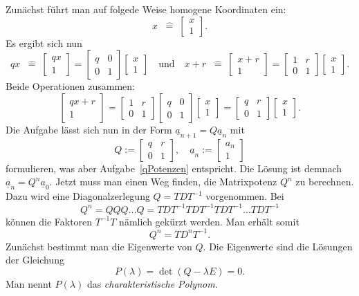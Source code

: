 \documentclass[a4paper,12pt,fleqn,twoside]{article}
\numberwithin{equation}{section}
\newcommand{\entspricht}{\;\;\hat =\;}
\theoremstyle{definition}
\begin{document}
Zunächst führt man auf folgede Weise homogene Koordinaten ein:
\[ x\entspricht\begin{bmatrix}x\\ 1\end{bmatrix}.\]
Es ergibt sich nun
\[ qx\entspricht\begin{bmatrix}qx\\ 1\end{bmatrix}
= \begin{bmatrix}
q & 0\\
0 & 1
\end{bmatrix}
\begin{bmatrix}x\\ 1\end{bmatrix}
\quad\text{und}\quad
x+r\entspricht\begin{bmatrix}x+r\\ 1\end{bmatrix}
= \begin{bmatrix}
1 & r\\
0 & 1
\end{bmatrix}
\begin{bmatrix}x\\ 1\end{bmatrix}.\]
Beide Operationen zusammen:
\[\begin{bmatrix}qx+r\\ 1\end{bmatrix}
= \begin{bmatrix}
1 & r\\
0 & 1
\end{bmatrix}
\begin{bmatrix}
q & 0\\
0 & 1
\end{bmatrix}
\begin{bmatrix}x\\ 1\end{bmatrix}
= \begin{bmatrix}
q & r\\
0 & 1
\end{bmatrix}
\begin{bmatrix}x\\ 1\end{bmatrix}.\]
Die Aufgabe lässt sich nun in der Form
$\underline a_{n+1} = Q\underline a_n$
mit
\[ Q:=\begin{bmatrix}
q & r\\
0 & 1
\end{bmatrix},\quad
\underline a_n := \begin{bmatrix}a_n\\ 1\end{bmatrix}\]
formulieren, was aber Aufgabe~\ref{qPotenzen} entspricht. Die
Lösung ist demnach
$\underline a_n = Q^n\underline a_0.$
Jetzt muss man einen Weg finden, die Matrixpotenz $Q^n$ zu berechnen.
Dazu wird eine Diagonalzerlegung $Q = TDT^{-1}$ vorgenommen.
Bei
\[Q^n = QQQ\ldots Q = TDT^{-1} TDT^{-1} TDT^{-1} \ldots TDT^{-1}\]
können die Faktoren $T^{-1}T$ nämlich gekürzt werden. Man erhält
somit
\[Q^n = TD^n T^{-1}.\]
Zunächst bestimmt man die Eigenwerte von $Q$. Die Eigenwerte
sind die Lösungen der Gleichung
\[P(\lambda) = \det(Q-\lambda E)=0.\]
Man nennt $P(\lambda)$ das \emph{charakteristische Polynom}.
\end{document}
